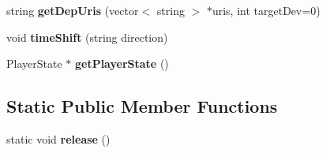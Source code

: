 \begin{CompactItemize}
\item 
string \textbf{getDepUris} (vector$<$ string $>$ $\ast$uris, int targetDev=0)\label{classbr_1_1pucrio_1_1telemidia_1_1ginga_1_1ncl_1_1FormatterMediator_78550d00d95702459c823315567bb166}

\item 
void \textbf{timeShift} (string direction)\label{classbr_1_1pucrio_1_1telemidia_1_1ginga_1_1ncl_1_1FormatterMediator_4c957efac0cbe36537ad4b97184298dc}

\item 
PlayerState $\ast$ \textbf{getPlayerState} ()\label{classbr_1_1pucrio_1_1telemidia_1_1ginga_1_1ncl_1_1FormatterMediator_d1125f5626717f8bebbdf3f644fd9deb}

\end{CompactItemize}
\subsection*{Static Public Member Functions}
\begin{CompactItemize}
\item 
static void \textbf{release} ()\label{classbr_1_1pucrio_1_1telemidia_1_1ginga_1_1ncl_1_1FormatterMediator_9e5d3fad9e601bb8c8c37183aaa737d2}

\end{CompactItemize}
